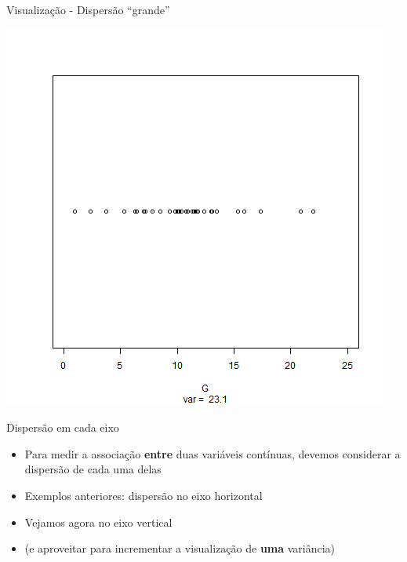 \documentclass{beamer}
\begin{document}
\begin{frame}{\small Visualização - Dispersão ``grande''}
  \begin{center}
    \includegraphics[height=.8\textheight]{Cap17/dot-G}
  \end{center}
\end{frame}

\begin{frame}{Dispersão em cada eixo}
  \begin{itemize}
    \footnotesize
  \item Para medir a associação {\bf entre} duas variáveis contínuas, devemos considerar a dispersão de cada uma delas
    \bigskip
    \small
  \item Exemplos anteriores: dispersão no eixo horizontal
  \item Vejamos agora no eixo vertical
    \bigskip
    \footnotesize
  \item (e aproveitar para incrementar a visualização de {\bf uma} variância)
  \end{itemize}
\end{frame}
\end{document}
